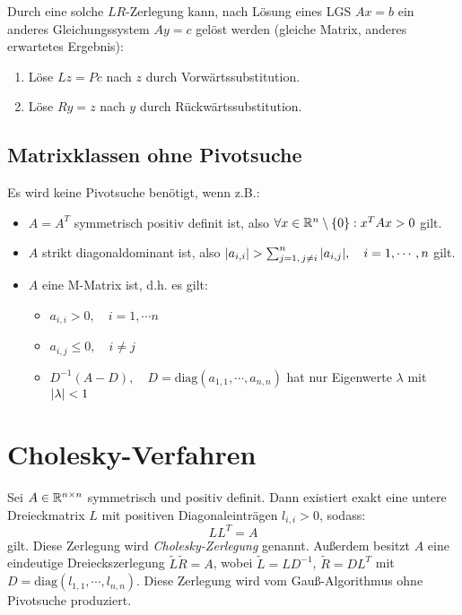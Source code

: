             Durch eine solche \(LR\)-Zerlegung kann, nach Lösung eines LGS \( Ax = b \) ein anderes Gleichungssystem \( Ay = c \) gelöst werden (gleiche Matrix, anderes erwartetes Ergebnis):
            \begin{enumerate}
            	\item Löse \( Lz = Pc \) nach \(z\) durch Vorwärtssubstitution.
            	\item Löse \( Ry = z \) nach \(y\) durch Rückwärtssubstitution.
            \end{enumerate}

        \subsection{Matrixklassen ohne Pivotsuche}
	        Es wird keine Pivotsuche benötigt, wenn z.B.:
	        \begin{itemize}
	        	\item \( A = A^T \) symmetrisch positiv definit ist, also \( \forall x \in \mathbb{R}^n \setminus \{0\} : x^T A x > 0 \) gilt.
	        	\item \(A\) strikt diagonaldominant ist, also \( \abs{a_{i,i}} > \sum_{j = 1,\, j \neq i}^{n} \abs{a_{i,j}}, \quad i = 1, \cdots, n \) gilt.
	        	\item \(A\) eine M-Matrix ist, d.h. es gilt:
		        	\begin{itemize}
		        		\item \( a_{i,i} > 0, \quad i = 1, \cdots n \)
		        		\item \( a_{i,j} \leq 0, \quad i \neq j \)
		        		\item \( D^{-1} (A - D), \quad D = \textrm{diag}(a_{1,1}, \cdots, a_{n,n}) \) hat nur Eigenwerte \(\lambda\) mit \( \abs{\lambda} < 1 \)
		        	\end{itemize}
	        \end{itemize}

    \section{Cholesky-Verfahren}
        Sei \(A \in \mathbb{R}^{n \times n}\) symmetrisch und positiv definit. Dann existiert exakt eine untere Dreieckmatrix \(L\) mit positiven Diagonaleinträgen \( l_{i,i} > 0 \), sodass:
        \begin{equation*}
	        LL^T = A
        \end{equation*}
        gilt. Diese Zerlegung wird \textit{Cholesky-Zerlegung} genannt. Außerdem besitzt \(A\) eine eindeutige Dreieckszerlegung \( \tilde{L}\tilde{R} = A \), wobei \( \tilde{L} = LD^{-1} \), \( \tilde{R} = DL^T \) mit \( D = \textrm{diag}(l_{1,1}, \cdots, l_{n,n}) \). Diese Zerlegung wird vom Gauß-Algorithmus ohne Pivotsuche produziert.


